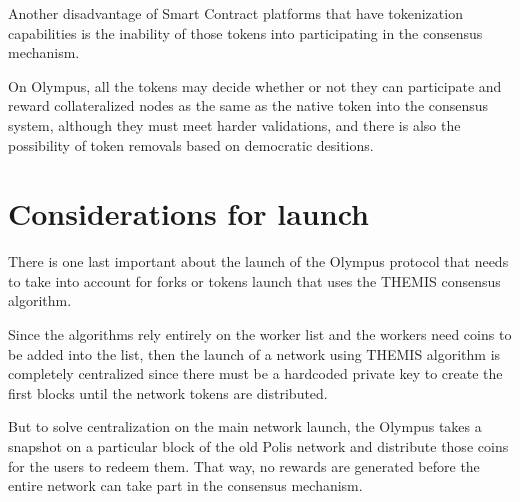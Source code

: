 \documentclass{article}
\begin{document}
	Another disadvantage of Smart Contract platforms that have tokenization capabilities is the inability of those tokens into participating in the consensus mechanism.
	
	On Olympus, all the tokens may decide whether or not they can participate and reward collateralized nodes as the same as the native token into the consensus system, although they must meet harder validations, and there is also the possibility of token removals based on democratic desitions.
		
	\section{Considerations for launch}
	
	There is one last important about the launch of the Olympus protocol that needs to take into account for forks or tokens launch that uses the THEMIS consensus algorithm.
	
	Since the algorithms rely entirely on the worker list and the workers need coins to be added into the list, then the launch of a network using THEMIS algorithm is completely centralized since there must be a hardcoded private key to create the first blocks until the network tokens are distributed.
	
	But to solve centralization on the main network launch, the Olympus takes a snapshot on a particular block of the old Polis network and distribute those coins for the users to redeem them. That way, no rewards are generated before the entire network can take part in the consensus mechanism.

	
	\printbibliography
	
\end{document}
